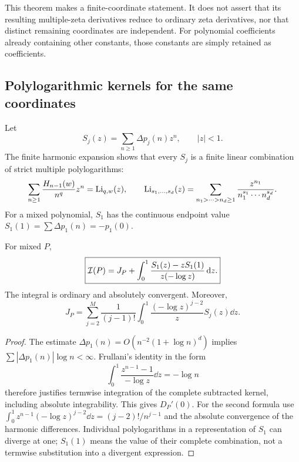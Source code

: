 This theorem makes a finite-coordinate statement. It does not assert
that its resulting multiple-zeta derivatives reduce to ordinary zeta
derivatives, nor that distinct remaining coordinates are independent.
For polynomial coefficients already containing other constants, those
constants are simply retained as coefficients.

\subsection{Polylogarithmic kernels for the same coordinates}

Let
\begin{equation}\label{poly:S}
 S_j(z)=\sum_{n\ge1}\Delta p_j(n)z^n,\qquad |z|<1.
\end{equation}
The finite harmonic expansion shows that every $S_j$ is a finite linear
combination of strict multiple polylogarithms:
\[
 \sum_{n\ge1}\frac{H_{n-1}(w)}{n^q}z^n=\operatorname{Li}_{q,w}(z),
 \qquad
 \operatorname{Li}_{s_1,\ldots,s_d}(z)=
 \sum_{n_1>\cdots>n_d\ge1}\frac{z^{n_1}}{n_1^{s_1}\cdots n_d^{s_d}}.
\]
For a mixed polynomial, $S_1$ has the continuous endpoint value
$S_1(1)=\sum\Delta p_1(n)=-p_1(0)$.

\begin{corollary}
\label{poly:polylog}
For mixed $P$,
\begin{equation}\label{poly:polylogeq}
 \boxed{\displaystyle
 \mathcal I(P)=J_P+\int_0^1
 \frac{S_1(z)-zS_1(1)}{z(-\log z)}\,\mathrm d z.}
\end{equation}
The integral is ordinary and absolutely convergent. Moreover,
\begin{equation}\label{poly:Jpolylog}
 J_P=\sum_{j=2}^M\frac1{(j-1)!}
 \int_0^1\frac{(-\log z)^{j-2}}z S_j(z)\dd z.
\end{equation}
\end{corollary}
\begin{proof}
The estimate $\Delta p_1(n)=O(n^{-2}(1+\log n)^d)$ implies
$\sum |\Delta p_1(n)|\log n<\infty$. Frullani's identity in the
form
\[
 \int_0^1\frac{z^{n-1}-1}{-\log z}\dd z=-\log n
\]
therefore justifies termwise integration of the complete subtracted
kernel, including absolute integrability. This gives $D_P'(0)$.
For the second formula use
$\int_0^1z^{n-1}(-\log z)^{j-2}\dd z=(j-2)!/n^{j-1}$
and the absolute convergence of the harmonic differences.
Individual polylogarithms in a representation of $S_1$ can diverge at
one; $S_1(1)$ means the value of their complete combination, not a
termwise substitution into a divergent expression.
\end{proof}

